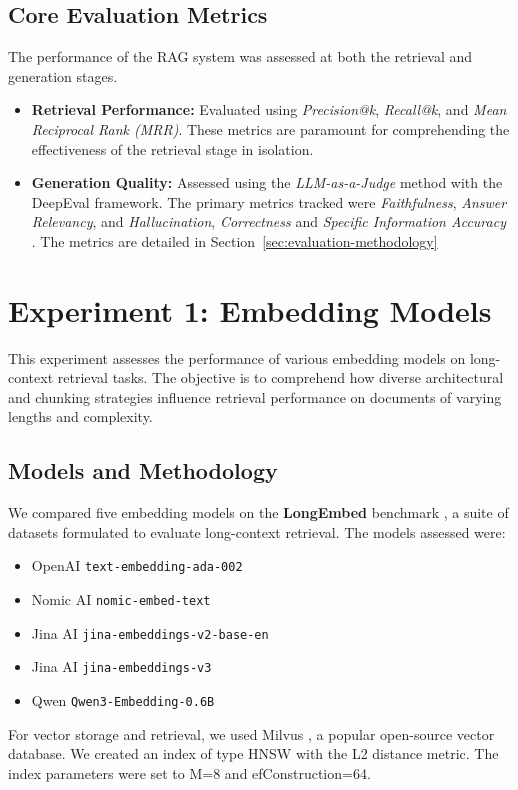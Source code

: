 \subsection{Core Evaluation Metrics}
The performance of the RAG system was assessed at both the retrieval and generation stages.
\begin{itemize}
\item \textbf{Retrieval Performance:} Evaluated using \textit{Precision@k}, \textit{Recall@k}, and \textit{Mean Reciprocal Rank (MRR)}. These metrics are paramount for comprehending the effectiveness of the retrieval stage in isolation.
\item \textbf{Generation Quality:} Assessed using the \textit{LLM-as-a-Judge} method with the DeepEval framework. The primary metrics tracked were \textit{Faithfulness}, \textit{Answer Relevancy}, and \textit{Hallucination}, \textit{Correctness} and \textit{Specific Information Accuracy} \autocite{zheng2023judging}. The metrics are detailed in Section~\ref{sec:evaluation-methodology}
\end{itemize}

\section{Experiment 1: Embedding Models}
\label{sec:exp_embedding_models}
This experiment assesses the performance of various embedding models on long-context retrieval tasks. The objective is to comprehend how diverse architectural and chunking strategies influence retrieval performance on documents of varying lengths and complexity.

\subsection{Models and Methodology}
We compared five embedding models on the \textbf{LongEmbed} benchmark \autocite{zhu2024longembedextendingembeddingmodels}, a suite of datasets formulated to evaluate long-context retrieval. The models assessed were:
\begin{itemize}
    \item OpenAI \texttt{text-embedding-ada-002}
    \item Nomic AI \texttt{nomic-embed-text}
    \item Jina AI \texttt{jina-embeddings-v2-base-en}
    \item Jina AI \texttt{jina-embeddings-v3}
    \item Qwen \texttt{Qwen3-Embedding-0.6B}
\end{itemize}
For vector storage and retrieval, we used Milvus \autocite{milvus}, a popular open-source vector database. We created an index of type HNSW with the L2 distance metric. The index parameters were set to M=8 and efConstruction=64.


